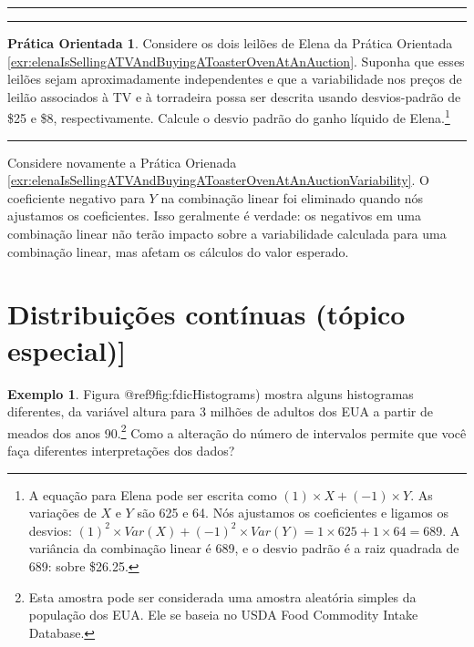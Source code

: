 \documentclass[
]{book}
\theoremstyle{definition}
\theoremstyle{definition}
\newtheorem{example}{Exemplo}[chapter]
\theoremstyle{definition}
\newtheorem{exercise}{Prática Orientada}[chapter]
\theoremstyle{definition}
\theoremstyle{remark}
\begin{document}
\begin{center}\rule{0.5\linewidth}{0.5pt}\end{center}

\begin{center}\rule{0.5\linewidth}{0.5pt}\end{center}

\begin{exercise}
\protect\hypertarget{exr:elenaIsSellingATVAndBuyingAToasterOvenAtAnAuctionVariability}{}{\label{exr:elenaIsSellingATVAndBuyingAToasterOvenAtAnAuctionVariability} }Considere os dois leilões de Elena da Prática Orientada \ref{exr:elenaIsSellingATVAndBuyingAToasterOvenAtAnAuction}. Suponha que esses leilões sejam aproximadamente independentes e que a variabilidade nos preços de leilão associados à TV e à torradeira possa ser descrita usando desvios-padrão de \$25 e \$8, respectivamente. Calcule o desvio padrão do ganho líquido de Elena.\footnote{A equação para Elena pode ser escrita como
  \((1)\times X + (-1)\times Y\). As variações de \(X\) e \(Y\) são 625 e 64. Nós ajustamos os coeficientes e ligamos os desvios: \((1)^2\times Var(X) + (-1)^2\times Var(Y) = 1\times 625 + 1\times 64 = 689\). A variância da combinação linear é 689, e o desvio padrão é a raiz quadrada de 689: sobre \$26.25.}
\end{exercise}

\begin{center}\rule{0.5\linewidth}{0.5pt}\end{center}

Considere novamente a Prática Orienada \ref{exr:elenaIsSellingATVAndBuyingAToasterOvenAtAnAuctionVariability}. O coeficiente negativo para \(Y\) na combinação linear foi eliminado quando nós ajustamos os coeficientes. Isso geralmente é verdade: os negativos em uma combinação linear não terão impacto sobre a variabilidade calculada para uma combinação linear, mas afetam os cálculos do valor esperado.

\hypertarget{contDist}{%
\section{Distribuições contínuas (tópico especial){]}}\label{contDist}}

\begin{example}
\protect\hypertarget{exm:usHeights}{}{\label{exm:usHeights} }Figura @ref9fig:fdicHistograms) mostra alguns histogramas diferentes, da variável altura para 3 milhões de adultos dos EUA a partir de meados dos anos 90.\footnote{Esta amostra pode ser considerada uma amostra aleatória simples da população dos EUA. Ele se baseia no USDA Food Commodity Intake Database.} Como a alteração do número de intervalos permite que você faça diferentes interpretações dos dados?
\end{example}
\end{document}
